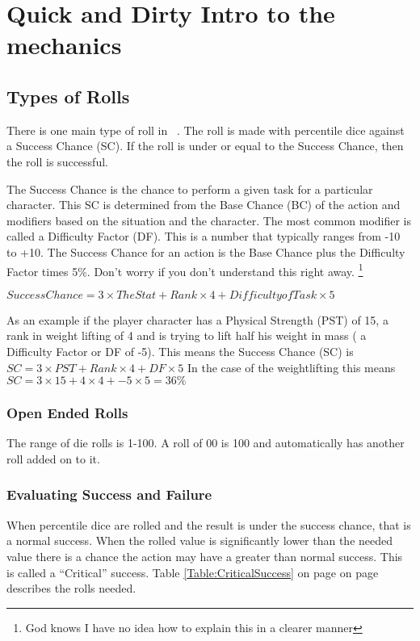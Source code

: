 \chapter{Quick and Dirty Intro to the mechanics}

\section{Types of Rolls}

There is one main type of roll in \SH\ . The roll is 
made with percentile dice against a Success Chance (SC). If the roll 
is under or equal to the Success Chance, then the roll is successful.

The Success Chance is the chance to perform a given task for a particular
character. This SC is determined from the Base Chance (BC) of the action 
and modifiers based on the situation and the character. The most common 
modifier is called a Difficulty Factor (DF). This is a number that typically 
ranges from -10 to +10. The Success Chance for an action is the Base Chance plus 
the Difficulty Factor times 5\%. Don't worry if you don't understand 
this right away. \footnote{God knows I have no idea how to explain 
this in a clearer manner}

$ {Success Chance} = 3 \times {The Stat} + Rank \times 4 + {Difficulty of
Task} \times 5 $

As an example if the player character has a Physical Strength (PST) of 15, a rank in 
weight lifting of 4 and is trying to lift half his weight in mass ( a Difficulty Factor or DF of -5). 
This means the Success Chance (SC) is $ SC = 3 \times PST + Rank \times 4 + DF \times 5 $
In the case of the weightlifting this means $ SC = 3 \times 15 + 4 \times 4 + -5 \times 5  = 36\% $

\subsection{Open Ended Rolls}

The range of die rolls is 1-100. A roll of 00 is 100 and 
automatically has another roll added on to it.

\subsection{Evaluating Success and Failure}

When percentile dice are rolled and the result is under the success chance, that
is a normal success. When the rolled value is significantly lower than the needed 
value there is a chance the action may have a greater than normal success. This is 
called a ``Critical'' success. Table \ref{Table:CriticalSuccess} on page on page~\pageref{Table:CriticalSuccess} describes the 
rolls needed.

